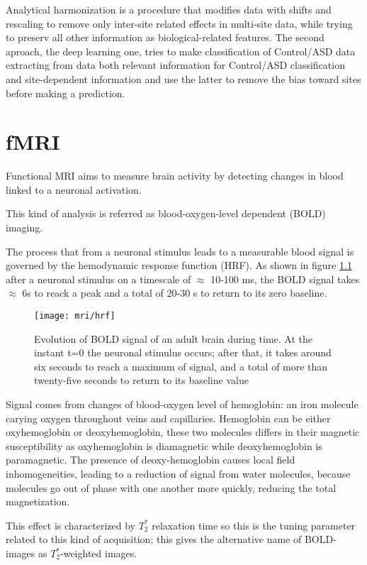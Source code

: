 \documentclass[12pt]{report}
\begin{document}
Analytical harmonization is a procedure that modifies data with shifts and rescaling to remove only inter-site related effects in multi-site data, while trying to preserv all other information as biological-related features.
The second aproach, the deep learning one, tries to make classification of Control/ASD data extracting from data both relevant information for Control/ASD classification and site-dependent information and use the latter to remove the bias toward sites before making a prediction.

\chapter{fMRI}

Functional MRI aims to measure brain activity by detecting changes in blood linked to a neuronal activation.

This kind of analysis is referred as blood-oxygen-level dependent (BOLD) imaging.


The process that from a neuronal stimulus leads to a measurable blood signal is governed by the hemodynamic response function (HRF).
As shown in figure \ref{fig:hrf} after a neuronal stimulus on a timescale of $\approx$ 10-100 ms, the BOLD signal takes $\approx$ 6s to reack a peak and a total of 20-30 s to return to its zero baseline.

\begin{figure}[h]
\centering
\texttt{[image: mri/hrf]}
\caption{Evolution of BOLD signal of an adult brain during time. At the instant t=0 the neuronal stimulus occurs; after that, it takes around six seconds to reach a maximum of signal, and a total of more than twenty-five seconds to return to its baseline value}
\label{fig:hrf}
\end{figure}

Signal comes from changes of blood-oxygen level of hemoglobin: an iron molecule carying oxygen throughout veins and capillaries.
Hemoglobin can be either oxyhemoglobin or deoxyhemoglobin, these two molecules differs in their magnetic susceptibility as oxyhemoglobin is diamagnetic while deoxyhemoglobin is paramagnetic.
The presence of deoxy-hemoglobin causes local field inhomogeneities, leading to a reduction of signal from water molecules, because molecules go out of phase with one another more quickly, reducing the total magnetization.

This effect is characterized by $T_2^{\ast}$ relaxation time so this is the tuning parameter related to this kind of acquisition; this gives the alternative name of BOLD-images as $T_2^{\ast}$-weighted images.
\end{document}
